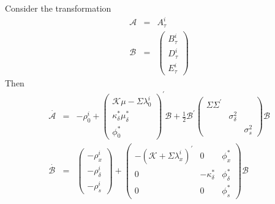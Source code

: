 \documentclass{article}
\begin{document}
Consider the transformation%
\begin{eqnarray*}
\mathcal{A} &=&A_{\tau }^{i} \\
\mathcal{B} &=&\left( 
\begin{array}{c}
B_{\tau }^{i} \\ 
D_{\tau }^{i} \\ 
E_{\tau }^{i}%
\end{array}%
\right)
\end{eqnarray*}%
Then%
\begin{eqnarray*}
\overset{\cdot }{\mathcal{A}} &=&-\rho _{0}^{i}+\left( 
\begin{array}{c}
\mathcal{K\mu }-\Sigma \lambda _{0}^{i} \\ 
\kappa _{\delta }^{\ast }\mu _{\delta }^{\ast } \\ 
\phi _{0}^{\ast }%
\end{array}%
\right) ^{\prime }\mathcal{B}+\frac{1}{2}\mathcal{B}^{\prime }%
\begin{pmatrix}
\Sigma \Sigma ^{\prime } &  &  \\ 
& \sigma _{\delta }^{2} &  \\ 
&  & \sigma _{s}^{2}%
\end{pmatrix}%
\mathcal{B} \\
\overset{\cdot }{\mathcal{B}} &=&\left( 
\begin{array}{c}
-\rho _{x}^{i} \\ 
-\rho _{\delta }^{i} \\ 
-\rho _{s}^{i}%
\end{array}%
\right) +%
\begin{pmatrix}
-\left( \mathcal{K}+\Sigma \lambda _{x}^{i}\right) ^{\prime } & 0 & \phi
_{x}^{\ast } \\ 
0 & -\kappa _{\delta }^{\ast } & \phi _{\delta }^{\ast } \\ 
0 & 0 & \phi _{s}^{\ast }%
\end{pmatrix}%
\mathcal{B}
\end{eqnarray*}
\end{document}
